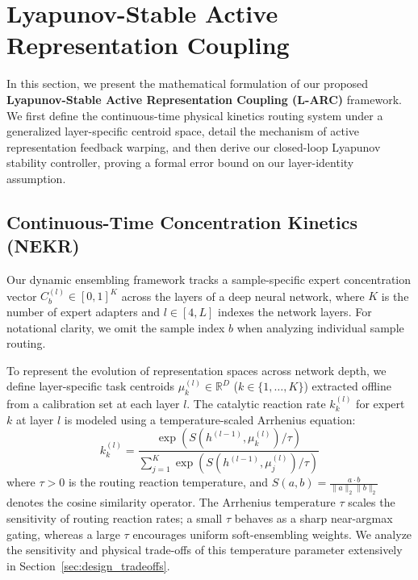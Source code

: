 \section{Lyapunov-Stable Active Representation Coupling}
\label{sec:method}

In this section, we present the mathematical formulation of our proposed \textbf{Lyapunov-Stable Active Representation Coupling (L-ARC)} framework. We first define the continuous-time physical kinetics routing system under a generalized layer-specific centroid space, detail the mechanism of active representation feedback warping, and then derive our closed-loop Lyapunov stability controller, proving a formal error bound on our layer-identity assumption.

\subsection{Continuous-Time Concentration Kinetics (NEKR)}
Our dynamic ensembling framework tracks a sample-specific expert concentration vector $C_b^{(l)} \in [0, 1]^K$ across the layers of a deep neural network, where $K$ is the number of expert adapters and $l \in [4, L]$ indexes the network layers. For notational clarity, we omit the sample index $b$ when analyzing individual sample routing.

To represent the evolution of representation spaces across network depth, we define layer-specific task centroids $\mu_k^{(l)} \in \mathbb{R}^D$ ($k \in \{1,\dots,K\}$) extracted offline from a calibration set at each layer $l$. The catalytic reaction rate $k_k^{(l)}$ for expert $k$ at layer $l$ is modeled using a temperature-scaled Arrhenius equation:
\begin{equation}
k_k^{(l)} = \frac{\exp\left(S(h^{(l-1)}, \mu_k^{(l)}) / \tau\right)}{\sum_{j=1}^K \exp\left(S(h^{(l-1)}, \mu_j^{(l)}) / \tau\right)}
\label{eq:arrhenius}
\end{equation}
where $\tau > 0$ is the routing reaction temperature, and $S(a, b) = \frac{a \cdot b}{\|a\|_2 \|b\|_2}$ denotes the cosine similarity operator. The Arrhenius temperature $\tau$ scales the sensitivity of routing reaction rates; a small $\tau$ behaves as a sharp near-argmax gating, whereas a large $\tau$ encourages uniform soft-ensembling weights. We analyze the sensitivity and physical trade-offs of this temperature parameter extensively in Section~\ref{sec:design_tradeoffs}.

